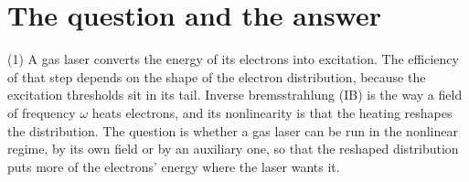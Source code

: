 \documentclass[11pt]{article}
\numberwithin{equation}{section}
\begin{document}
\section{The question and the answer}
\label{sec:answer}

{\noindent}(1) A gas laser converts the energy of its electrons into
excitation. The efficiency of that step depends on the shape of the electron
distribution, because the excitation thresholds sit in its tail. Inverse
bremsstrahlung (IB) is the way a field of frequency $\omega$ heats electrons,
and its nonlinearity is that the heating reshapes the distribution. The
question is whether a gas laser can be run in the nonlinear regime, by its own
field or by an auxiliary one, so that the reshaped distribution puts more of
the electrons' energy where the laser wants it.
\end{document}
